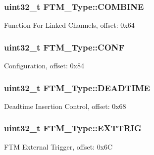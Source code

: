 \subsubsection[{\texorpdfstring{C\+O\+M\+B\+I\+NE}{COMBINE}}]{ uint32\+\_\+t F\+T\+M\+\_\+\+Type\+::\+C\+O\+M\+B\+I\+NE}\hypertarget{structFTM__Type_ac4684173f8183e0cf75d1ae384a9de62}{}\label{structFTM__Type_ac4684173f8183e0cf75d1ae384a9de62}
Function For Linked Channels, offset\+: 0x64 
\subsubsection[{\texorpdfstring{C\+O\+NF}{CONF}}]{ uint32\+\_\+t F\+T\+M\+\_\+\+Type\+::\+C\+O\+NF}\hypertarget{structFTM__Type_aefdaf80da88ac945ee6e55088e7e3587}{}\label{structFTM__Type_aefdaf80da88ac945ee6e55088e7e3587}
Configuration, offset\+: 0x84 
\subsubsection[{\texorpdfstring{D\+E\+A\+D\+T\+I\+ME}{DEADTIME}}]{ uint32\+\_\+t F\+T\+M\+\_\+\+Type\+::\+D\+E\+A\+D\+T\+I\+ME}\hypertarget{structFTM__Type_a7ef7e543dc67cfc33c569f78b2aa2e4b}{}\label{structFTM__Type_a7ef7e543dc67cfc33c569f78b2aa2e4b}
Deadtime Insertion Control, offset\+: 0x68 
\subsubsection[{\texorpdfstring{E\+X\+T\+T\+R\+IG}{EXTTRIG}}]{ uint32\+\_\+t F\+T\+M\+\_\+\+Type\+::\+E\+X\+T\+T\+R\+IG}\hypertarget{structFTM__Type_ae705852108790f7c8c005b3b9d944b41}{}\label{structFTM__Type_ae705852108790f7c8c005b3b9d944b41}
F\+TM External Trigger, offset\+: 0x6C 
